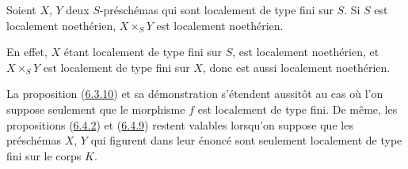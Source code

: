 \begin{corollary}[6.6.7]
\label{I.6.6.7-fr}
Soient $X$, $Y$ deux $S$-préschémas qui sont localement de type fini sur $S$.
Si $S$ est localement noethérien, $X\times_S Y$ est localement noethérien.
\end{corollary}

En effet, $X$ étant localement de type fini sur $S$, est localement
noethérien, et $X\times_S Y$ est localement de type fini sur $X$, donc est
aussi localement noethérien.

\begin{remark}[6.6.8]
\label{I.6.6.8-fr}
La proposition (\hyperref[I.6.3.10-fr]{6.3.10}) et sa démonstration s'étendent
aussitôt au cas où l'on suppose seulement que le morphisme $f$ est localement
de type fini. De même, les propositions
(\hyperref[I.6.4.2-fr]{6.4.2}) et (\hyperref[I.6.4.9-fr]{6.4.9}) restent
valables lorsqu'on suppose que les préschémas $X$, $Y$ qui figurent dans leur
énoncé sont seulement localement de type fini sur le corps $K$.
\end{remark}
